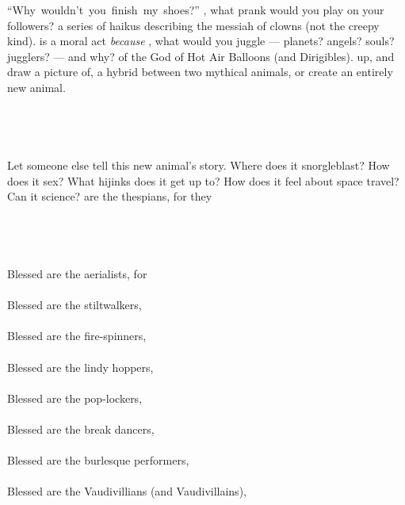 \hbox{\footnotesize{``Why wouldn't you finish my shoes?''}}
\clearpage
\clearpage
\bversenonum {}, what prank would you play on your followers?
\clearpage
\clearpage
\bversenonum {} a series of haikus describing the messiah of clowns (not the creepy kind).
\clearpage
\clearpage
\bversenonum {} is a moral act \textit{because}
\clearpage
\clearpage
\bversenonum {}, what would you juggle --- planets? angels? souls? jugglers? --- and why?
\clearpage
\clearpage
\bversenonum {} of the God of Hot Air Balloons (and Dirigibles).
\clearpage
\clearpage
\bversenonum {} up, and draw a picture of, a hybrid between two mythical animals, or create an entirely new animal.
\\
\\
\\
\\
\\
\bverse Let someone else tell this new animal's story.
\bverse Where does it snorgleblast?
\bverse How does it sex?
\bverse What hijinks does it get up to?
\bverse How does it feel about space travel?
\bverse Can it science?
\clearpage
\clearpage
\bversenonum {} are the thespians, for they\\
\\
\\
\\
\\
\bverse Blessed are the aerialists, for\\
\\
\bverse Blessed are the stiltwalkers, \\
\\
\bverse Blessed are the fire-spinners, \\
\\
\bverse Blessed are the lindy hoppers, \\
\\
\bverse Blessed are the pop-lockers, \\
\\
\bverse Blessed are the break dancers, \\
\\
\bverse Blessed are the burlesque performers, \\
\\
\bverse Blessed are the Vaudivillians (and Vaudivillains), \\
